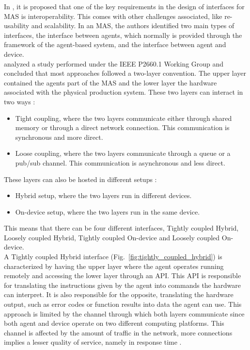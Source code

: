 In \cite{Karnouskos2019}, it is proposed that one of the key requirements in the design of interfaces for \acrshort{MAS} is interoperability. This comes with other challenges associated, like re-usability and scalability. In an \acrshort{MAS}, the authors identified two main types of interfaces, the interface between agents, which normally is provided through the framework of the agent-based system, and the interface between agent and device. \\


\citeauthor{8591641} \cite{8591641} analyzed a study performed under the IEEE P2660.1 Working Group \cite{9340089} and concluded that most approaches followed a two-layer convention. The upper layer contained the agents part of the \acrshort{MAS} and the lower layer the hardware associated with the physical production system. These two layers can interact in two ways \cite{8591641}:
\begin{itemize}
	\item Tight coupling, where the two layers communicate either through shared memory or through a direct network connection. This communication is synchronous and more direct.
	\item Loose coupling, where the two layers communicate through a queue or a pub/sub channel. This communication is asynchronous and less direct.
\end{itemize}

These layers can also be hosted in different setups \cite{8591641}:
\begin{itemize}
	\item Hybrid setup, where the two layers run in different devices.
	\item On-device setup, where the two layers run in the same device. 
\end{itemize}

This means that there can be four different interfaces, Tightly coupled Hybrid, Loosely coupled Hybrid, Tightly coupled On-device and Loosely coupled On-device.\\

A Tightly coupled Hybrid interface (Fig.~\ref{fig:tightly_coupled_hybrid}) is characterized by having the upper layer where the agent operates running remotely and accessing the lower layer through an \acrshort{API}. This \acrshort{API} is responsible for translating the instructions given by the agent into commands the hardware can interpret. It is also responsible for the opposite, translating the hardware output, such as error codes or function results into data the agent can use. This approach is limited by the channel through which both layers communicate since both agent and device operate on two different computing platforms. This channel is affected by the amount of traffic in the network, more connections implies a lesser quality of service, namely in response time \cite{8591641}.\\

